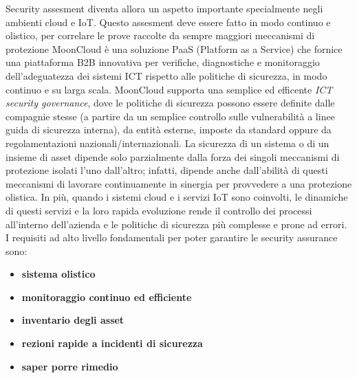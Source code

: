 Security assesment diventa allora un aspetto importante specialmente negli ambienti cloud e IoT. Questo 
assesment deve essere fatto in modo continuo e olistico, per correlare le prove raccolte da sempre maggiori 
meccanismi di protezione
\newline
MoonCloud è una soluzione PaaS (Platform as a Service) che fornice una piattaforma B2B innovativa per verifiche, 
diagnostiche e monitoraggio dell'adeguatezza dei sistemi ICT rispetto alle politiche di sicurezza, in modo continuo 
e su larga scala.
MoonCloud supporta una semplice ed efficente \textit{ICT security governance}, dove le politiche di sicurezza possono
essere definite dalle compagnie stesse (a partire da un semplice controllo sulle vulnerabilità a linee guida di
sicurezza interna), da entità esterne, imposte da standard oppure da regolamentazioni nazionali/internazionali.
\newline
La sicurezza di un sistema o di un insieme di asset dipende solo parzialmente dalla forza dei
singoli meccanismi di protezione isolati l'uno dall'altro; infatti, dipende anche dall'abilità di questi meccanismi 
di lavorare continuamente in sinergia per provvedere a una protezione olistica.
In più, quando i sistemi cloud e i servizi IoT sono coinvolti, le dinamiche di questi servizi e la loro rapida 
evoluzione rende il controllo dei processi all'interno dell'azienda e le politiche di sicurezza 
più complesse e prone ad errori.
\newline
I requisiti ad alto livello fondamentali per poter garantire le security assurance sono:
\begin{itemize}
	\item \textbf{sistema olistico}
	\item \textbf{monitoraggio continuo ed efficiente}
	\item \textbf{inventario degli asset}
	\item \textbf{rezioni rapide a incidenti di sicurezza}
	\item \textbf{saper porre rimedio}
\end{itemize}